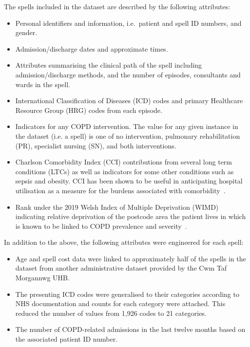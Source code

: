 \documentclass[11pt]{article}
\begin{document}
The spells included in the dataset are described by the following attributes:
\begin{itemize}
    \item Personal identifiers and information, i.e.\ patient and spell ID
        numbers, and gender.
    \item Admission/discharge dates and approximate times.
    \item Attributes summarising the clinical path of the spell including
        admission/discharge methods, and the number of episodes, consultants and
        wards in the spell.
    \item International Classification of Diseases (ICD) codes and primary
        Healthcare Resource Group (HRG) codes from each episode.
    \item Indicators for any COPD intervention. The value for any given instance
        in the dataset (i.e. a spell) is one of no intervention, pulmonary
        rehabilitation (PR), specialist nursing (SN), and both interventions.
    \item Charlson Comorbidity Index (CCI) contributions from several long term
        conditions (LTCs) as well as indicators for some other conditions such
        as sepsis and obesity. CCI has been shown to be useful in anticipating
        hospital utilisation as a measure for the burdens associated with
        comorbidity~\cite{Simon2011}.
    \item Rank under the 2019 Welsh Index of Multiple Deprivation (WIMD)
        indicating relative deprivation of the postcode area the patient lives
        in which is known to be linked to COPD prevalence and
        severity~\cite{Collins2018,Sexton2016,Steiner2017}.
\end{itemize}

In addition to the above, the following attributes were engineered for each
spell:
\begin{itemize}
    \item Age and spell cost data were linked to approximately half of the
        spells in the dataset from another administrative dataset provided by
        the Cwm Taf Morgannwg UHB.\
    \item The presenting ICD codes were generalised to their categories
        according to NHS documentation and counts for each category were
        attached. This reduced the number of values from
        1,926 codes to 21 categories.
    \item The number of COPD-related admissions in the last twelve months based
        on the associated patient ID number.
\end{itemize}
\end{document}
